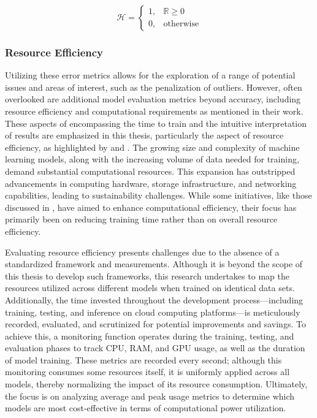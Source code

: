 \documentclass{article}
\begin{document}
\begin{equation}
    \mathcal{H} = \begin{cases}
        1, & \mathbb{R} \geq 0 \\
        0, & \text{otherwise}
    \end{cases}
\end{equation}

\subsubsection{Resource Efficiency}

Utilizing these error metrics allows for the exploration of a range of potential issues and areas of interest, such as the penalization of outliers. However, often overlooked are additional model evaluation metrics beyond accuracy, including resource efficiency and computational requirements as \cite{transformers-effectiveness} mentioned in their work. These aspects of encompassing the time to train and the intuitive interpretation of results are emphasized in this thesis, particularly the aspect of resource efficiency, as highlighted by \cite{AI_energy_consumption} and \cite{resource_awareness}. The growing size and complexity of machine learning models, along with the increasing volume of data needed for training, demand substantial computational resources. This expansion has outstripped advancements in computing hardware, storage infrastructure, and networking capabilities, leading to sustainability challenges. While some initiatives, like those discussed in \cite{Informer}, have aimed to enhance computational efficiency, their focus has primarily been on reducing training time rather than on overall resource efficiency.

Evaluating resource efficiency presents challenges due to the absence of a standardized framework and measurements. Although it is beyond the scope of this thesis to develop such frameworks, this research undertakes to map the resources utilized across different models when trained on identical data sets. Additionally, the time invested throughout the development process—including training, testing, and inference on cloud computing platforms—is meticulously recorded, evaluated, and scrutinized for potential improvements and savings. To achieve this, a monitoring function operates during the training, testing, and evaluation phases to track CPU, RAM, and GPU usage, as well as the duration of model training. These metrics are recorded every second; although this monitoring consumes some resources itself, it is uniformly applied across all models, thereby normalizing the impact of its resource consumption. Ultimately, the focus is on analyzing average and peak usage metrics to determine which models are most cost-effective in terms of computational power utilization.
\end{document}
